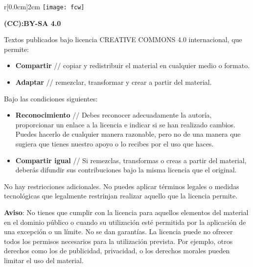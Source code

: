 
\thispagestyle{empty}
{
	\sffamily\scriptsize
	\setlength\parindent{0em}
	
	\begin{wrapfigure}[2]{r}[0.0cm]{2cm}
		\vspace{-0.75cm}
		\texttt{[image: fcw]}
	\end{wrapfigure}
	
	\textbf{(CC):BY-SA 4.0}
	
	\vspace{.5\baselineskip}
	
	Textos publicados bajo licencia CREATIVE COMMONS 4.0 internacional, que permite:
	
	\begin{itemize}
	\item \textbf{Compartir} // copiar y redistribuir el material en cualquier medio o formato.
	\item \textbf{Adaptar} // remezclar, transformar y crear a partir del material.
	\end{itemize}
	
	Bajo las condiciones siguientes:
	
	\begin{itemize}
	\item \textbf{Reconocimiento} // Debes reconocer adecuadamente la autoría, proporcionar un enlace a la licencia e indicar si se han realizado cambios. Puedes hacerlo de cualquier manera razonable, pero no de una manera que sugiera que tienes nuestro apoyo o lo recibes por el uso que haces.
	\item \textbf{Compartir igual} // Si remezclas, transformas o creas a partir del material, deberás difundir sus contribuciones bajo la misma licencia que el original.
	\end{itemize}
	
	No hay restricciones adicionales. No puedes aplicar términos legales o medidas tecnológicas que legalmente restrinjan realizar aquello que la licencia permite.
	
	\vspace{1.0\baselineskip}
	
	\textbf{Aviso}: No tienes que cumplir con la licencia para aquellos elementos del material en el dominio público o cuando su utilización esté permitida por la aplicación de una excepción o un límite. No se dan garantías. La licencia puede no ofrecer todos los permisos necesarios para la utilización prevista. Por ejemplo, otros derechos como los de publicidad, privacidad, o los derechos morales pueden limitar el uso del material.
	
}

